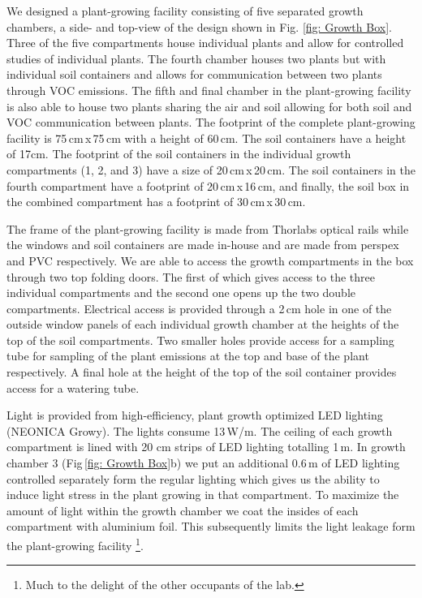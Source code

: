 \documentclass[reprint,superscriptaddress,aps,amsmath,amssymb]{revtex4-1}
\begin{document}
We designed a plant-growing facility consisting of five separated growth chambers, a side- and top-view of the design shown in Fig. \ref{fig: Growth Box}. Three of the five compartments house individual plants and allow for controlled studies of individual plants. The fourth chamber houses two plants but with individual soil containers and allows for communication between two plants through VOC emissions. The fifth and final chamber in the plant-growing facility is also able to house two plants sharing the air and soil allowing for both soil and VOC communication between plants. The footprint of the complete plant-growing facility is 75\,cm\,x\,75\,cm with a height of 60\,cm. The soil containers have a height of 17cm. The footprint of the soil containers in the individual growth compartments (1, 2, and 3) have a size of 20\,cm\,x\,20\,cm. The soil containers in the fourth compartment have a footprint of  20\,cm\,x\,16\,cm, and finally, the soil box in the combined compartment has a footprint of 30\,cm\,x\,30\,cm.

The frame of the plant-growing facility is made from Thorlabs optical rails while the windows and soil containers are made in-house and are made from perspex and PVC respectively.
We are able to access the growth compartments in the box through two top folding doors. The first of which gives access to the three individual compartments and the second one opens up the two double compartments. Electrical access is provided through a 2\,cm hole in one of the outside window panels of each individual growth chamber at the heights of the top of the soil compartments. Two smaller holes provide access for a sampling tube for sampling of the plant emissions at the top and base of the plant respectively. A final hole at the height of the top of the soil container provides access for a watering tube.

Light is provided from high-efficiency, plant growth optimized LED lighting (NEONICA Growy). The lights consume 13\,W/m. The ceiling of each growth compartment is lined with 20 cm strips of LED lighting totalling 1\,m. In growth chamber 3 (Fig\,\ref{fig: Growth Box}b) we put an additional 0.6\,m of LED lighting controlled separately form the regular lighting which gives us the ability to induce light stress in the plant growing in that compartment. To maximize the amount of light within the growth chamber we coat the insides of each compartment with aluminium foil. This subsequently limits the light leakage form the plant-growing facility \footnote{Much to the delight of the other occupants of the lab.}.
\end{document}
